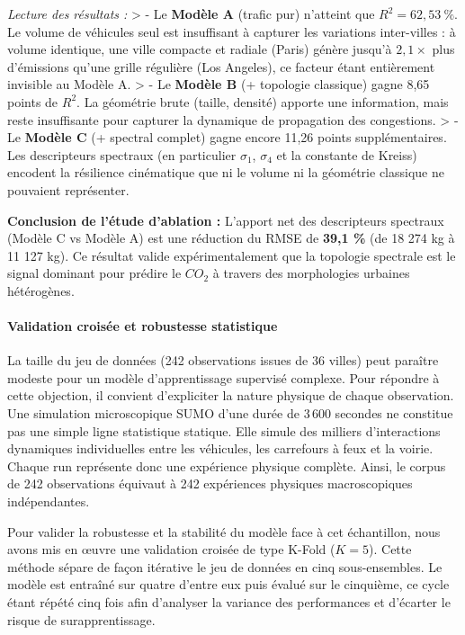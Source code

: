 \documentclass[10pt, a4paper]{article}
\begin{document}
\emph{Lecture des résultats :} \textgreater{} - Le \textbf{Modèle A}
(trafic pur) n'atteint que \(R^2 = 62{,}53\ \%\). Le volume de véhicules
seul est insuffisant à capturer les variations inter-villes : à volume
identique, une ville compacte et radiale (Paris) génère jusqu'à
\(2{,}1\times\) plus d'émissions qu'une grille régulière (Los Angeles),
ce facteur étant entièrement invisible au Modèle A. \textgreater{} - Le
\textbf{Modèle B} (+ topologie classique) gagne 8,65 points de \(R^2\).
La géométrie brute (taille, densité) apporte une information, mais reste
insuffisante pour capturer la dynamique de propagation des congestions.
\textgreater{} - Le \textbf{Modèle C} (+ spectral complet) gagne encore
11,26 points supplémentaires. Les descripteurs spectraux (en particulier
\(\sigma_1\), \(\sigma_4\) et la constante de Kreiss) encodent la
résilience cinématique que ni le volume ni la géométrie classique ne
pouvaient représenter.

\textbf{Conclusion de l'étude d'ablation :} L'apport net des
descripteurs spectraux (Modèle C vs Modèle A) est une réduction du RMSE
de \textbf{39,1 \%} (de 18 274 kg à 11 127 kg). Ce résultat valide
expérimentalement que la topologie spectrale est le signal dominant pour
prédire le \(CO_2\) à travers des morphologies urbaines hétérogènes.

\paragraph{Validation croisée et robustesse
statistique}\label{validation-croisuxe9e-et-robustesse-statistique}

La taille du jeu de données (242 observations issues de 36 villes) peut
paraître modeste pour un modèle d'apprentissage supervisé complexe. Pour
répondre à cette objection, il convient d'expliciter la nature physique
de chaque observation. Une simulation microscopique SUMO d'une durée de
3\,600 secondes ne constitue pas une simple ligne statistique statique.
Elle simule des milliers d'interactions dynamiques individuelles entre
les véhicules, les carrefours à feux et la voirie. Chaque run représente
donc une expérience physique complète. Ainsi, le corpus de 242
observations équivaut à 242 expériences physiques macroscopiques
indépendantes.

Pour valider la robustesse et la stabilité du modèle face à cet
échantillon, nous avons mis en œuvre une validation croisée de type
K-Fold (\(K=5\)). Cette méthode sépare de façon itérative le jeu de
données en cinq sous-ensembles. Le modèle est entraîné sur quatre
d'entre eux puis évalué sur le cinquième, ce cycle étant répété cinq
fois afin d'analyser la variance des performances et d'écarter le risque
de surapprentissage.
\end{document}
